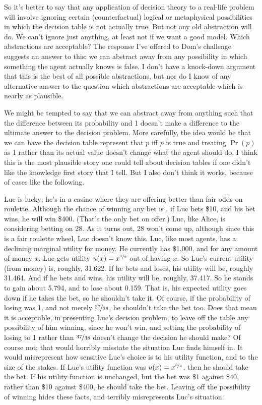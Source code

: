 So it's better to say that any application of decision theory to a real-life problem will involve ignoring certain (counterfactual) logical or metaphysical possibilities in which the decision table is not actually true. But not any old abstraction will do. We can't ignore just anything, at least not if we want a good model. Which abstractions are acceptable? The response I've offered to Dom's challenge suggests an answer to this: we can abstract away from any possibility in which something the agent actually knows is false. I don't have a knock-down argument that this is the best of all possible abstractions, but nor do I know of any alternative answer to the question which abstractions are acceptable which is nearly as plausible.

We might be tempted to say that we can abstract away from anything such that the difference between its probability and 1 doesn't make a difference to the ultimate answer to the decision problem. More carefully, the idea would be that we can have the decision table represent that $p$ iff $p$ is true and treating $\Pr(p)$ as 1 rather than its actual value doesn't change what the agent should do. I think this is the most plausible story one could tell about decision tables if one didn't like the knowledge first story that I tell. But I also don't think it works, because of cases like the following.

Luc is lucky; he's in a casino where they are offering better than fair odds on roulette. Although the chance of winning any bet is , if Luc bets \$10, and his bet wins, he will win \$400. (That's the only bet on offer.) Luc, like Alice, is considering betting on 28. As it turns out, 28 won't come up, although since this is a fair roulette wheel, Luc doesn't know this. Luc, like most agents, has a declining marginal utility for money. He currently has \$1,000, and for any amount of money $x$, Luc gets utility $u(x) = x^{\nicefrac{1}{2}}$ out of having $x$. So Luc's current utility (from money) is, roughly, 31.622. If he bets and loses, his utility will be, roughly 31.464. And if he bets and wins, his utility will be, roughly, 37.417. So he stands to gain about 5.794, and to lose about 0.159. That is, his expected utility goes down if he takes the bet, so he shouldn't take it. Of course, if the probability of losing was 1, and not merely $\nicefrac{37}{38}$, he shouldn't take the bet too. Does that mean it is acceptable, in presenting Luc's decision problem, to leave off the table any possibility of him winning, since he won't win, and setting the probability of losing to 1 rather than $\nicefrac{37}{38}$ doesn't change the decision he should make? Of course not; that would horribly misstate the situation Luc finds himself in. It would misrepresent  how sensitive Luc's choice is to his utility function, and to the size of the stakes. If Luc's utility function was $u(x) = x^{\nicefrac{3}{4}}$, then he should take the bet. If his utility function is unchanged, but the bet was \$1 against \$40, rather than \$10 against \$400, he should take the bet. Leaving off the possibility of winning hides these facts, and terribly misrepresents Luc's situation.

